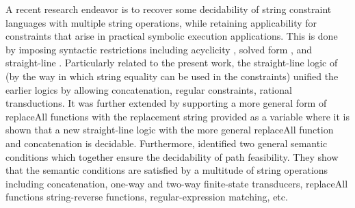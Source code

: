 A recent research endeavor %
is to recover some decidability of string constraint
languages with multiple string operations, while retaining applicability for constraints that
arise in practical symbolic execution applications. This is done by imposing syntactic restrictions
including acyclicity \cite{Abdulla14,BFL13}, solved form \cite{Vijay-length}, and
straight-line \cite{LB16,HJLRV18,CCH+18}.
Particularly related to the present work, the straight-line logic of \cite{LB16}  (by the way in which string equality can be
used in the constraints) unified the earlier logics by allowing concatenation, regular constraints, rational
transductions. %
It was further extended %
by supporting a more general form of replaceAll functions with the replacement string provided as a
variable \cite{CCH+18} where it is shown that a new straight-line logic with the more general replaceAll function and
concatenation is decidable. Furthermore, \cite{CHL+19} identified two general semantic conditions which together ensure the decidability of path
feasibility. They show that the semantic conditions  are satisfied by a multitude of string operations
including concatenation, one-way and two-way finite-state transducers, replaceAll functions
string-reverse functions, regular-expression matching, etc. 



